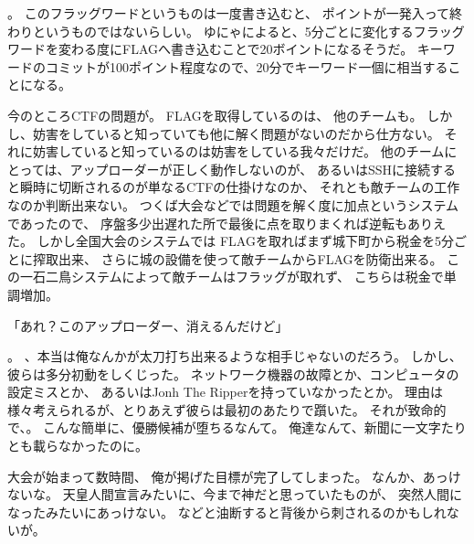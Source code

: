 。
このフラッグワードというものは一度書き込むと、
ポイントが一発入って終わりというものではないらしい。
ゆにゃによると、5分ごとに変化するフラッグワードを変わる度にFLAGへ書き込むことで20ボイントになるそうだ。
キーワードのコミットが100ポイント程度なので、20分でキーワード一個に相当することになる。

今のところCTFの問題が。
FLAGを取得しているのは、
他のチームも。
しかし、妨害をしていると知っていても他に解く問題がないのだから仕方ない。
それに妨害していると知っているのは妨害をしている我々だけだ。
他のチームにとっては、アップローダーが正しく動作しないのが、
あるいはSSHに接続すると瞬時に切断されるのが単なるCTFの仕掛けなのか、
それとも敵チームの工作なのか判断出来ない。
つくば大会などでは問題を解く度に加点というシステムであったので、
序盤多少出遅れた所で最後に点を取りまくれば逆転もありえた。
しかし全国大会のシステムでは%
FLAGを取ればまず城下町から税金を5分ごとに搾取出来、
さらに城の設備を使って敵チームからFLAGを防衛出来る。
この一石二鳥システムによって敵チームはフラッグが取れず、
こちらは税金で単調増加。

「あれ？このアップローダー、消えるんだけど」

。
、本当は俺なんかが太刀打ち出来るような相手じゃないのだろう。
しかし、彼らは多分初動をしくじった。
ネットワーク機器の故障とか、コンピュータの設定ミスとか、
あるいはJonh The Ripperを持っていなかったとか。
理由は様々考えられるが、とりあえず彼らは最初のあたりで躓いた。
それが致命的で、。
こんな簡単に、優勝候補が堕ちるなんて。
俺達なんて、新聞に一文字たりとも載らなかったのに。

大会が始まって数時間、
俺が掲げた目標が完了してしまった。
なんか、あっけないな。
天皇人間宣言みたいに、今まで神だと思っていたものが、
突然人間になったみたいにあっけない。
などと油断すると背後から刺されるのかもしれないが。

